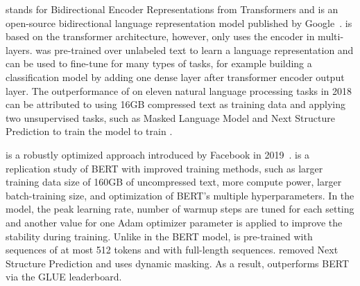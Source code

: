 \Bert stands for Bidirectional Encoder Representations from Transformers and is an open-source bidirectional language representation model published by Google~\cite{DevlinCLT2019}. 
\Bert is based on the transformer architecture, however, \Bert only uses the encoder in multi-layers. 
\Bert was pre-trained over unlabeled text to learn a language representation and can be used to fine-tune for many types of tasks, for example building a classification model by adding one dense layer after transformer encoder output layer. 
The outperformance of \Bert on eleven natural language processing tasks in 2018 can be attributed to using 16GB compressed text as training data and applying two unsupervised tasks, such as Masked Language Model and Next Structure Prediction to train the \Bert model to train \Bert.

\Roberta is a robustly optimized \Bert approach introduced by Facebook in 2019~\cite{LiuOGDJCLLZS2019}. 
\Roberta is a replication study of BERT with improved training methods, such as larger training data size of 160GB of uncompressed text, more compute power, larger batch-training size, and optimization of BERT’s multiple hyperparameters. 
In the \Roberta model, the peak learning rate, number of warmup steps are tuned for each setting and another value for one Adam optimizer parameter is applied to improve the stability during training. 
Unlike in the BERT model, \Roberta is pre-trained with sequences of at most 512 tokens and with full-length sequences. 
\Roberta removed Next Structure Prediction and uses dynamic masking. 
As a result, \Roberta outperforms BERT via the GLUE leaderboard.

